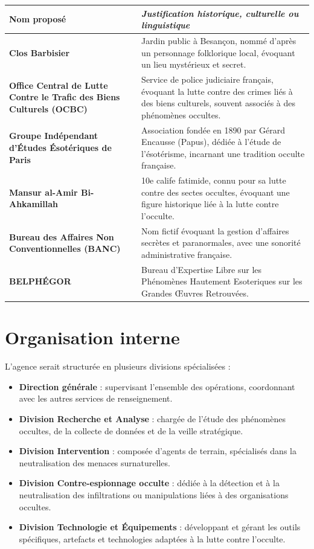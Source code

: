 \documentclass[10pt,a5paper,twoside]{book}
\begin{document}
\begin{center}
	\begin{tabular}{|>{\bfseries}P{4cm}|P{7cm}|}
	\hline
	\textbf{Nom proposé }													&	\emph{Justification historique, culturelle ou linguistique}	\\ \hline
	Clos Barbisier															&	Jardin public à Besançon, nommé d'après un personnage folklorique local, évoquant un lieu mystérieux et secret.	\\ \hline
	Office Central de Lutte Contre le Trafic des Biens Culturels (OCBC)		&	Service de police judiciaire français, évoquant la lutte contre des crimes liés à des biens culturels, souvent associés à des phénomènes occultes.	\\ \hline
	Groupe Indépendant d'Études Ésotériques de Paris						&	Association fondée en 1890 par Gérard Encausse (Papus), dédiée à l'étude de l'ésotérisme, incarnant une tradition occulte française.	\\ \hline
	Mansur al-Amir Bi-Ahkamillah											&	10e calife fatimide, connu pour sa lutte contre des sectes occultes, évoquant une figure historique liée à la lutte contre l'occulte.	\\ \hline
	Bureau des Affaires Non Conventionnelles (BANC)							&	Nom fictif évoquant la gestion d'affaires secrètes et paranormales, avec une sonorité administrative française.	\\ \hline
	BELPHÉGOR																&	Bureau d'Expertise Libre sur les Phénomènes Hautement Esoteriques sur les Grandes Œuvres Retrouvées.	\\ \hline
	\end{tabular}
\end{center}

\newpage

\section{Organisation interne}

L'agence serait structurée en plusieurs divisions spécialisées :
\begin{itemize}
	\item \textbf{Direction générale} : supervisant l'ensemble des opérations, coordonnant avec les autres services de renseignement.  
	\item \textbf{Division Recherche et Analyse} : chargée de l'étude des phénomènes occultes, de la collecte de données et de la veille stratégique.  
	\item \textbf{Division Intervention} : composée d'agents de terrain, spécialisés dans la neutralisation des menaces surnaturelles.  
	\item \textbf{Division Contre-espionnage occulte} : dédiée à la détection et à la neutralisation des infiltrations ou manipulations liées à des organisations occultes.  
	\item \textbf{Division Technologie et Équipements} : développant et gérant les outils spécifiques, artefacts et technologies adaptées à la lutte contre l'occulte.
\end{itemize}
\end{document}
